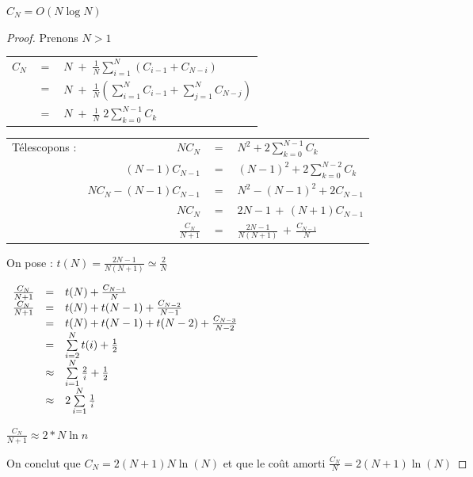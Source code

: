 \begin{proposition}
$C_{N} = O(N \log N)$
\end{proposition}

\begin{proof}
Prenons $N > 1$

\begin{tabular}{r c l}
	$C_{N}$ & $=$ & $N \;+\; \frac{1}{N} \sum\limits_{i = 1}^{N} ( C_{i-1} + C_{N - i} )$ \\
	
			& $=$ & $N \;+\; \frac{1}{N} (\sum\limits_{i = 1}^{N} C_{i-1} + \sum\limits_{j = 1}^{N} C_{N - j})$ \\
			
			& $=$ & $N \;+\; \frac{1}{N} \; 2 \sum\limits_{k = 0}^{N-1} C_{k}$

\end{tabular}

\begin{tabular}{l r c l}
	Télescopons : & $N C_{N}$ & $=$ & $N^{2} + 2 \sum\limits_{k = 0}^{N-1} C_{k}$ \\
	& $(N-1) C_{N-1}$ & $=$ & $(N-1)^{2} + 2 \sum\limits_{k = 0}^{N-2} C_{k}$ \\
	& $N C_{N} - (N-1) C_{N-1}$ & $=$ & $N^{2} - (N-1)^{2} + 2 C_{N-1}$ \\
	& $N C_{N}$ & $=$ & $2 N - 1 \,+\, (N+1) C_{N-1}$ \\
	& $\frac{C_{N}}{N+1}$ & $=$ & $\frac{2N - 1}{N(N+1)} \,+\, \frac{C_{N-1}}{N}$

\end{tabular}

On pose : $t(N) = \frac{2N-1}{N(N+1)} \simeq \frac{2}{N}$

$\begin{array}{c c l}
	\frac{C_{N}}{N+1} & = & t(N) + \frac{C_{N-1}}{N} \\
	\frac{C_{N}}{N+1} & = & t(N) + t(N-1) + \frac{C_{N-2}}{N-1} \\
					& = & t(N) + t(N-1) + t(N-2) + \frac{C_{N-3}}{N-2} \\
					& = & \sum\limits_{i = 2}^{N} t(i) + \frac{1}{2} \\
					& \approx & \sum\limits_{i = 1}^{N} \frac{2}{i} + \frac{1}{2} \\
					& \approx & 2 \sum\limits_{i = 1}^{N} \frac{1}{i}
\end{array}$

$\frac{C_{N}}{N+1} \approx 2 * N \ln n$

On conclut que $C_{N} = 2 (N+1) N \ln(N)$ et que le coût amorti $\frac{C_{N}}{N} = 2(N+1) \ln(N)$

\end{proof}
